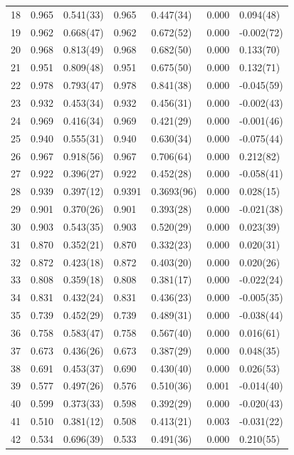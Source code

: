 \documentclass[aps, prc, tightenlines,superscriptaddress, letterpaper, amsmath, amssymb, preprintnumbers, floatfix, longbibliography, nofootinbib]{revtex4-2}
\begin{document}
\begin{table}[!htb]
{\begin{tabularx}{\textwidth}{| c || Y | Y | Y | Y | Y | Y |}
18	&	0.965	&	0.541(33)	&	0.965	&	0.447(34)	&	0.000	&	0.094(48)	\\
19	&	0.962	&	0.668(47)	&	0.962	&	0.672(52)	&	0.000	&	-0.002(72)	\\
20	&	0.968	&	0.813(49)	&	0.968	&	0.682(50)	&	0.000	&	0.133(70)	\\
21	&	0.951	&	0.809(48)	&	0.951	&	0.675(50)	&	0.000	&	0.132(71)	\\
22	&	0.978	&	0.793(47)	&	0.978	&	0.841(38)	&	0.000	&	-0.045(59)	\\
23	&	0.932	&	0.453(34)	&	0.932	&	0.456(31)	&	0.000	&	-0.002(43)	\\
24	&	0.969	&	0.416(34)	&	0.969	&	0.421(29)	&	0.000	&	-0.001(46)	\\
25	&	0.940	&	0.555(31)	&	0.940	&	0.630(34)	&	0.000	&	-0.075(44)	\\
26	&	0.967	&	0.918(56)	&	0.967	&	0.706(64)	&	0.000	&	0.212(82)	\\
27	&	0.922	&	0.396(27)	&	0.922	&	0.452(28)	&	0.000	&	-0.058(41)	\\
28	&	0.939	&	0.397(12)	&	0.9391	&	0.3693(96)	&	0.000	&	0.028(15)	\\
29	&	0.901	&	0.370(26)	&	0.901	&	0.393(28)	&	0.000	&	-0.021(38)	\\
30	&	0.903	&	0.543(35)	&	0.903	&	0.520(29)	&	0.000	&	0.023(39)	\\
31	&	0.870	&	0.352(21)	&	0.870	&	0.332(23)	&	0.000	&	0.020(31)	\\
32	&	0.872	&	0.423(18)	&	0.872	&	0.403(20)	&	0.000	&	0.020(26)	\\
33	&	0.808	&	0.359(18)	&	0.808	&	0.381(17)	&	0.000	&	-0.022(24)	\\
34	&	0.831	&	0.432(24)	&	0.831	&	0.436(23)	&	0.000	&	-0.005(35)	\\
35	&	0.739	&	0.452(29)	&	0.739	&	0.489(31)	&	0.000	&	-0.038(44)	\\
36	&	0.758	&	0.583(47)	&	0.758	&	0.567(40)	&	0.000	&	0.016(61)	\\
37	&	0.673	&	0.436(26)	&	0.673	&	0.387(29)	&	0.000	&	0.048(35)	\\
38	&	0.691	&	0.453(37)	&	0.690	&	0.430(40)	&	0.000	&	0.026(53)	\\
39	&	0.577	&	0.497(26)	&	0.576	&	0.510(36)	&	0.001	&	-0.014(40)	\\
40	&	0.599	&	0.373(33)	&	0.598	&	0.392(29)	&	0.000	&	-0.020(43)	\\
41	&	0.510	&	0.381(12)	&	0.508	&	0.413(21)	&	0.003	&	-0.031(22)	\\
42	&	0.534	&	0.696(39)	&	0.533	&	0.491(36)	&	0.000	&	0.210(55)	\\

\end{tabularx}}
\end{table}
\end{document}
